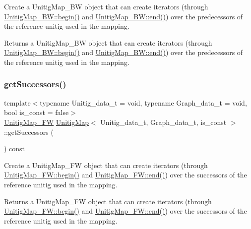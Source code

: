 Create a Unitig\+Map\+\_\+\+BW object that can create iterators (through \hyperlink{classBackwardCDBG_a134d64079a7acdcad727637647691897}{Unitig\+Map\+\_\+\+B\+W\+::begin()} and \hyperlink{classBackwardCDBG_a7b8f84da503325c3e3e2b5b024ed6997}{Unitig\+Map\+\_\+\+B\+W\+::end()}) over the predecessors of the reference unitig used in the mapping. 

\begin{DoxyReturn}{Returns}
a Unitig\+Map\+\_\+\+BW object that can create iterators (through \hyperlink{classBackwardCDBG_a134d64079a7acdcad727637647691897}{Unitig\+Map\+\_\+\+B\+W\+::begin()} and \hyperlink{classBackwardCDBG_a7b8f84da503325c3e3e2b5b024ed6997}{Unitig\+Map\+\_\+\+B\+W\+::end()}) over the predecessors of the reference unitig used in the mapping. 
\end{DoxyReturn}
\mbox{\label{classUnitigMap_a5b2894e0f78e6b003d06a03a49904b59}} 
\subsubsection{\texorpdfstring{get\+Successors()}{getSuccessors()}}
{\footnotesize\ttfamily template$<$typename Unitig\+\_\+data\+\_\+t = void, typename Graph\+\_\+data\+\_\+t = void, bool is\+\_\+const = false$>$ \\
\hyperlink{classForwardCDBG}{Unitig\+Map\+\_\+\+FW} \hyperlink{classUnitigMap}{Unitig\+Map}$<$ Unitig\+\_\+data\+\_\+t, Graph\+\_\+data\+\_\+t, is\+\_\+const $>$\+::get\+Successors (\begin{DoxyParamCaption}{ }\end{DoxyParamCaption}) const}



Create a Unitig\+Map\+\_\+\+FW object that can create iterators (through \hyperlink{classForwardCDBG_a18fd34268b50793eabde303c3e9ed5db}{Unitig\+Map\+\_\+\+F\+W\+::begin()} and \hyperlink{classForwardCDBG_a83c2f8b929022aa77289177ec5ce7869}{Unitig\+Map\+\_\+\+F\+W\+::end()}) over the successors of the reference unitig used in the mapping. 

\begin{DoxyReturn}{Returns}
a Unitig\+Map\+\_\+\+FW object that can create iterators (through \hyperlink{classForwardCDBG_a18fd34268b50793eabde303c3e9ed5db}{Unitig\+Map\+\_\+\+F\+W\+::begin()} and \hyperlink{classForwardCDBG_a83c2f8b929022aa77289177ec5ce7869}{Unitig\+Map\+\_\+\+F\+W\+::end()}) over the successors of the reference unitig used in the mapping. 
\end{DoxyReturn}
\mbox{\label{classUnitigMap_a594c471e4d757273feef67cf4358bafd}} 
